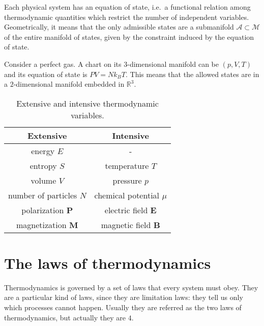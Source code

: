     Each physical system has an equation of state, i.e.~a functional relation among thermodynamic quantities which restrict the number of independent variables. Geometrically, it means that the only admissible states are a submanifold $\mathcal A \subset \mathcal M$ of the entire manifold of states, given by the constraint induced by the equation of state.

    \begin{example}
        Consider a perfect gas. A chart on its $3$-dimensional manifold can be $(p, V, T)$ and its equation of state is $PV = N k_B T$. This means that the allowed states are in a $2$-dimensional manifold embedded in $\mathbb R^3$.
    \end{example}

    \begin{table}[h!]
        \centering
        \begin{tabular}{c | c }
            Extensive & Intensive \\
            \hline
            energy $E$ & - \\ 
            entropy $S$ & temperature $T$ \\ 
            volume $V$ & pressure $p$\\ 
            number of particles $N$ & chemical potential $\mu$ \\ 
            polarization $\mathbf P$ & electric field $\mathbf E$ \\ 
            magnetization $\mathbf M$ & magnetic field $\mathbf B$ \\ 
        \end{tabular}
        \caption{Extensive and intensive thermodynamic variables.}
        \label{table:td:1}
    \end{table}

\section{The laws of thermodynamics}

    Thermodynamics is governed by a set of laws that every system must obey. They are a particular kind of laws, since they are limitation laws: they tell us only which processes cannot happen. Usually they are referred as the two laws of thermodynamics, but actually they are $4$.


